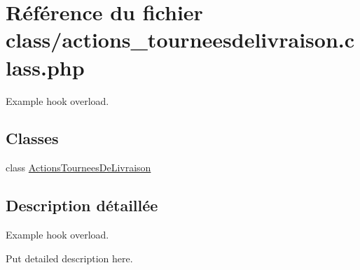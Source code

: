 \hypertarget{actions__tourneesdelivraison_8class_8php}{}\section{Référence du fichier class/actions\+\_\+tourneesdelivraison.class.\+php}
\label{actions__tourneesdelivraison_8class_8php}


Example hook overload.  


\subsection*{Classes}
\begin{DoxyCompactItemize}
\item 
class \hyperlink{classActionsTourneesDeLivraison}{Actions\+Tournees\+De\+Livraison}
\end{DoxyCompactItemize}


\subsection{Description détaillée}
Example hook overload. 

Put detailed description here. 
